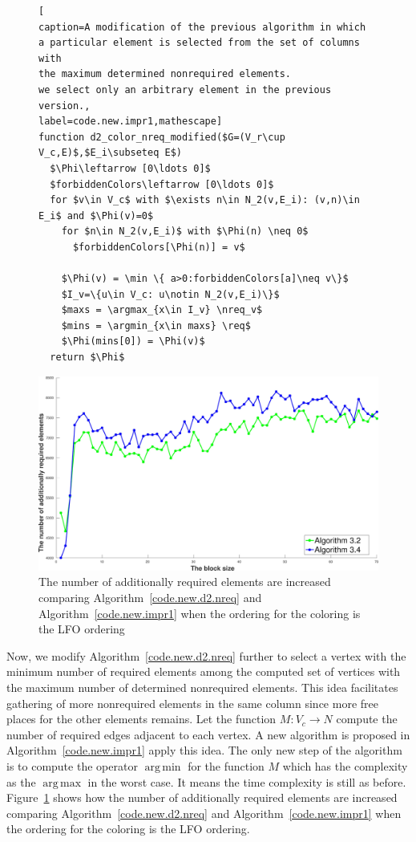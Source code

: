 \documentclass[12pt, twoside,a4paper,toc=bibliography]{scrbook}
\DeclareMathOperator*{\argmin}{arg\,min}
\DeclareMathOperator*{\argmax}{arg\,max}
\newcommand{\figref}[1]{Figure~\protect\ref{#1}}
\newcommand{\coderef}[1]{Algorithm~\protect\ref{#1}}
\newcommand{\nreq}{L}
\newcommand{\req}{M}
\begin{document}
\begin{figure}
\begin{lstlisting}[
caption=A modification of the previous algorithm in which
a particular element is selected from the set of columns with
the maximum determined nonrequired elements.
we select only an arbitrary element in the previous version.,
label=code.new.impr1,mathescape]
function d2_color_nreq_modified($G=(V_r\cup V_c,E)$,$E_i\subseteq E$)
  $\Phi\leftarrow [0\ldots 0]$
  $forbiddenColors\leftarrow [0\ldots 0]$
  for $v\in V_c$ with $\exists n\in N_2(v,E_i): (v,n)\in E_i$ and $\Phi(v)=0$
    for $n\in N_2(v,E_i)$ with $\Phi(n) \neq 0$
      $forbiddenColors[\Phi(n)] = v$

    $\Phi(v) = \min \{ a>0:forbiddenColors[a]\neq v\}$
    $I_v=\{u\in V_c: u\notin N_2(v,E_i)\}$
    $maxs = \argmax_{x\in I_v} \nreq_v$
    $mins = \argmin_{x\in maxs} \req$
    $\Phi(mins[0]) = \Phi(v)$
  return $\Phi$
\end{lstlisting}
\end{figure}

\begin{figure}
\centering
\includegraphics[width=0.9\linewidth]{ex33_alg32_alg34_bls_lfo_add}
\caption{The number of additionally
required elements are increased comparing
\coderef{code.new.d2.nreq} and \coderef{code.new.impr1} when the ordering for the coloring
is the LFO ordering}
\label{ex33_alg32_alg34_bls_lfo_add}
\end{figure}

Now, we modify \coderef{code.new.d2.nreq} further to select a vertex with the minimum number of 
required elements among the computed set of vertices with the maximum number of determined nonrequired elements.
This idea facilitates gathering of more nonrequired elements in the same column since
more free places for the other elements remains.
Let the function $\req: V_c\rightarrow N$ compute the number of required edges adjacent to each vertex.
A new algorithm is proposed in \coderef{code.new.impr1} apply this idea. 
The only new step of the algorithm is to compute the operator $\argmin$ for the 
function $\req$ which has the complexity as the $\argmax$ in the worst case.
It means the time complexity is still as before.
\figref{ex33_alg32_alg34_bls_lfo_add} shows how the number of additionally
required elements are increased comparing
\coderef{code.new.d2.nreq} and \coderef{code.new.impr1} when the ordering for the coloring
is the LFO ordering.
\end{document}
